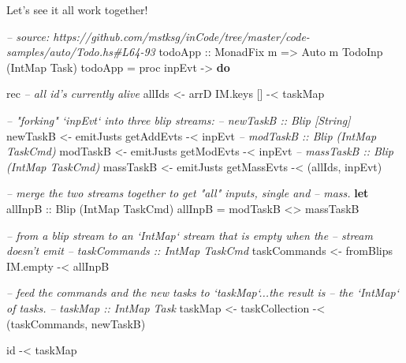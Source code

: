 \documentclass[]{article}
\newenvironment{Shaded}{}{}
\newcommand{\KeywordTok}[1]{\textcolor[rgb]{0.00,0.44,0.13}{\textbf{#1}}}
\newcommand{\DataTypeTok}[1]{\textcolor[rgb]{0.56,0.13,0.00}{#1}}
\newcommand{\CommentTok}[1]{\textcolor[rgb]{0.38,0.63,0.69}{\textit{#1}}}
\newcommand{\OtherTok}[1]{\textcolor[rgb]{0.00,0.44,0.13}{#1}}
\newcommand{\FunctionTok}[1]{\textcolor[rgb]{0.02,0.16,0.49}{#1}}
\newcommand{\NormalTok}[1]{#1}
\begin{document}
Let's see it all work together!

\begin{Shaded}
\begin{Highlighting}[]
\CommentTok{-- source: https://github.com/mstksg/inCode/tree/master/code-samples/auto/Todo.hs#L64-93}
\OtherTok{todoApp ::} \DataTypeTok{MonadFix}\NormalTok{ m }\OtherTok{=>} \DataTypeTok{Auto}\NormalTok{ m }\DataTypeTok{TodoInp}\NormalTok{ (}\DataTypeTok{IntMap} \DataTypeTok{Task}\NormalTok{)}
\NormalTok{todoApp }\FunctionTok{=}\NormalTok{ proc inpEvt }\OtherTok{->} \KeywordTok{do}

\NormalTok{    rec }\CommentTok{-- all id's currently alive}
\NormalTok{        allIds }\OtherTok{<-}\NormalTok{ arrD IM.keys [] }\FunctionTok{-<}\NormalTok{ taskMap}

        \CommentTok{-- "forking" `inpEvt` into three blip streams:}
        \CommentTok{-- newTaskB :: Blip [String]}
\NormalTok{        newTaskB  }\OtherTok{<-}\NormalTok{ emitJusts getAddEvts  }\FunctionTok{-<}\NormalTok{ inpEvt}
        \CommentTok{-- modTaskB :: Blip (IntMap TaskCmd)}
\NormalTok{        modTaskB  }\OtherTok{<-}\NormalTok{ emitJusts getModEvts  }\FunctionTok{-<}\NormalTok{ inpEvt}
        \CommentTok{-- massTaskB :: Blip (IntMap TaskCmd)}
\NormalTok{        massTaskB }\OtherTok{<-}\NormalTok{ emitJusts getMassEvts }\FunctionTok{-<}\NormalTok{ (allIds, inpEvt)}

        \CommentTok{-- merge the two streams together to get "all" inputs, single and}
        \CommentTok{-- mass.}
        \KeywordTok{let}\OtherTok{ allInpB ::} \DataTypeTok{Blip}\NormalTok{ (}\DataTypeTok{IntMap} \DataTypeTok{TaskCmd}\NormalTok{)}
\NormalTok{            allInpB }\FunctionTok{=}\NormalTok{ modTaskB }\FunctionTok{<>}\NormalTok{ massTaskB}

        \CommentTok{-- from a blip stream to an `IntMap` stream that is empty when the}
        \CommentTok{-- stream doesn't emit}
        \CommentTok{-- taskCommands :: IntMap TaskCmd}
\NormalTok{        taskCommands }\OtherTok{<-}\NormalTok{ fromBlips IM.empty }\FunctionTok{-<}\NormalTok{ allInpB}

        \CommentTok{-- feed the commands and the new tasks to `taskMap`...the result is}
        \CommentTok{-- the `IntMap` of tasks.}
        \CommentTok{-- taskMap :: IntMap Task}
\NormalTok{        taskMap }\OtherTok{<-}\NormalTok{ taskCollection }\FunctionTok{-<}\NormalTok{ (taskCommands, newTaskB)}

\NormalTok{    id }\FunctionTok{-<}\NormalTok{ taskMap}
\end{Highlighting}
\end{Shaded}
\end{document}
